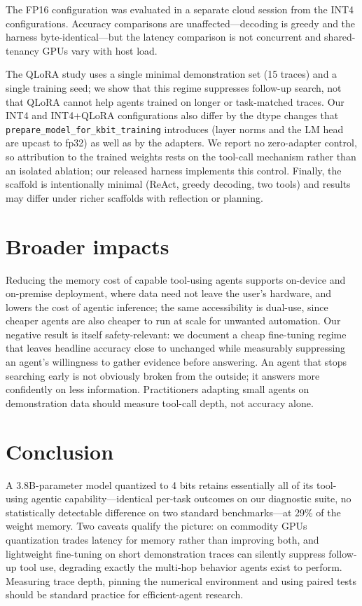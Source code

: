 \documentclass{article}
\begin{document}
The FP16 configuration was evaluated in a separate cloud session from the INT4
configurations. Accuracy comparisons are unaffected---decoding is greedy and
the harness byte-identical---but the latency comparison is not concurrent and
shared-tenancy GPUs vary with host load.

The QLoRA study uses a single minimal demonstration set (15 traces) and a
single training seed; we show that this regime suppresses follow-up search,
not that QLoRA cannot help agents trained on longer or task-matched traces.
Our INT4 and INT4+QLoRA configurations also differ by the dtype changes that
\texttt{prepare\_model\_for\_kbit\_training} introduces (layer norms and the LM
head are upcast to fp32) as well as by the adapters. We report no zero-adapter
control, so attribution to the trained weights rests on the tool-call
mechanism rather than an isolated ablation; our released harness implements
this control. Finally, the scaffold is intentionally minimal (ReAct, greedy
decoding, two tools) and results may differ under richer scaffolds with
reflection or planning.

\section{Broader impacts}
\label{sec:impacts}

Reducing the memory cost of capable tool-using agents supports on-device and
on-premise deployment, where data need not leave the user's hardware, and
lowers the cost of agentic inference; the same accessibility is dual-use,
since cheaper agents are also cheaper to run at scale for unwanted automation.
Our negative result is itself safety-relevant: we document a cheap fine-tuning
regime that leaves headline accuracy close to unchanged while measurably
suppressing an agent's willingness to gather evidence before answering. An
agent that stops searching early is not obviously broken from the outside; it
answers more confidently on less information. Practitioners adapting small
agents on demonstration data should measure tool-call depth, not accuracy
alone.

\section{Conclusion}

A 3.8B-parameter model quantized to 4 bits retains essentially all of its
tool-using agentic capability---identical per-task outcomes on our diagnostic
suite, no statistically detectable difference on two standard
benchmarks---at 29\% of the weight memory. Two caveats qualify the picture:
on commodity GPUs quantization trades latency for memory rather than improving
both, and lightweight fine-tuning on short demonstration traces can silently
suppress follow-up tool use, degrading exactly the multi-hop behavior agents
exist to perform. Measuring trace depth, pinning the numerical environment and using paired
tests should be standard practice for efficient-agent research.
\end{document}
